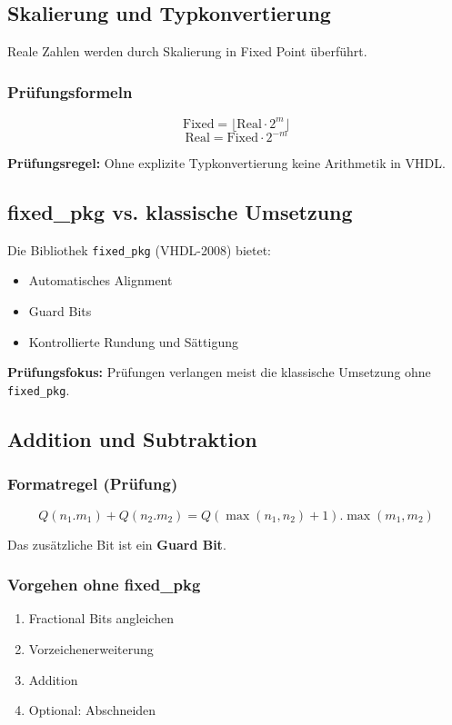 \documentclass[11pt,a4paper]{article}
\newcommand{\hilite}[1]{\colorbox{yellow!25}{#1}}
\newcommand{\imp}[1]{\textbf{\textcolor{codeemph}{#1}}}
\begin{document}
\subsection{Skalierung und Typkonvertierung}
Reale Zahlen werden durch Skalierung in Fixed Point überführt.

\subsubsection*{\textcolor{codeemph}{Prüfungsformeln}}
\[
\text{Fixed} = \lfloor \text{Real} \cdot 2^m \rfloor
\]
\[
\text{Real} = \text{Fixed} \cdot 2^{-m}
\]

\imp{Prüfungsregel:}  
Ohne \hilite{explizite} \hilite{Typkonvertierung} keine \hilite{Arithmetik} in VHDL.

\subsection{fixed\_pkg vs. klassische Umsetzung}
Die Bibliothek \texttt{fixed\_pkg} (VHDL-2008) bietet:
\begin{itemize}
  \item Automatisches Alignment
  \item Guard Bits
  \item Kontrollierte Rundung und Sättigung
\end{itemize}

\imp{Prüfungsfokus:}  
\hilite{Prüfungen} \hilite{verlangen} \hilite{meist} die klassische Umsetzung ohne \texttt{fixed\_pkg}.

\subsection{Addition und Subtraktion}

\subsubsection*{\textcolor{codeemph}{Formatregel (Prüfung)}}
\[
Q(n_1.m_1) + Q(n_2.m_2)
= Q(\max(n_1,n_2)+1).\max(m_1,m_2)
\]

Das zusätzliche Bit ist ein \textbf{Guard Bit}.

\subsubsection*{Vorgehen ohne fixed\_pkg}
\begin{enumerate}
  \item Fractional Bits angleichen
  \item Vorzeichenerweiterung
  \item Addition
  \item Optional: Abschneiden
\end{enumerate}
\end{document}
